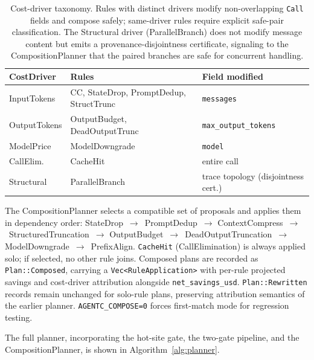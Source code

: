 \begin{table}[t]
\caption{Cost-driver taxonomy. Rules with distinct drivers modify non-overlapping
\texttt{Call} fields and compose safely; same-driver rules require explicit safe-pair
classification. The Structural driver (ParallelBranch) does not modify message content
but emits a provenance-disjointness certificate, signaling to the CompositionPlanner
that the paired branches are safe for concurrent handling.}
\label{tab:costdrivers}
\footnotesize
\begin{tabularx}{\textwidth}{@{} l X X @{}}
\toprule
CostDriver & Rules & Field modified \\
\midrule
InputTokens  & CC, StateDrop, PromptDedup, StructTrunc & \texttt{messages} \\
OutputTokens & OutputBudget, DeadOutputTrunc & \texttt{max\_output\_tokens} \\
ModelPrice   & ModelDowngrade  & \texttt{model} \\
CallElim.    & CacheHit        & entire call \\
Structural   & ParallelBranch  & trace topology (disjointness cert.) \\
\bottomrule
\end{tabularx}
\end{table}

The CompositionPlanner selects a compatible set of proposals and applies them in
dependency order: StateDrop~$\rightarrow$~PromptDedup~$\rightarrow$
ContextCompress~$\rightarrow$~StructuredTruncation~$\rightarrow$
OutputBudget~$\rightarrow$~DeadOutputTruncation~$\rightarrow$
ModelDowngrade~$\rightarrow$~PrefixAlign. \texttt{CacheHit} (CallElimination) is
always applied solo; if selected, no other rule joins. Composed plans are recorded as
\texttt{Plan::Composed}, carrying a \texttt{Vec<RuleApplication>} with per-rule
projected savings and cost-driver attribution alongside \texttt{net\_savings\_usd}.
\texttt{Plan::Rewritten} records remain unchanged for solo-rule plans, preserving
attribution semantics of the earlier planner. \texttt{AGENTC\_COMPOSE=0} forces
first-match mode for regression testing.

The full planner, incorporating the hot-site gate, the two-gate pipeline, and the
CompositionPlanner, is shown in Algorithm~\ref{alg:planner}.

